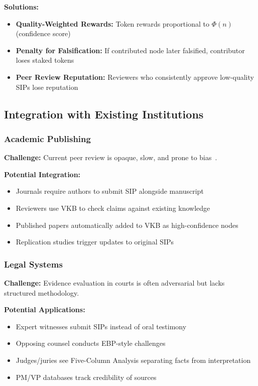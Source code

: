 \documentclass[11pt,a4paper]{article}
\theoremstyle{definition}
\theoremstyle{remark}
\newcommand{\VKB}{\textsc{VKB}}
\newcommand{\SIP}{\textsc{SIP}}
\newcommand{\EBP}{\textsc{EBP}}
\begin{document}
\textbf{Solutions:}
\begin{itemize}
    \item \textbf{Quality-Weighted Rewards:} Token rewards proportional to $\Phi(n)$ (confidence score)
    \item \textbf{Penalty for Falsification:} If contributed node later falsified, contributor loses staked tokens
    \item \textbf{Peer Review Reputation:} Reviewers who consistently approve low-quality \SIP{}s lose reputation
\end{itemize}

\subsection{Integration with Existing Institutions}

\subsubsection{Academic Publishing}

\textbf{Challenge:} Current peer review is opaque, slow, and prone to bias~\citep{ioannidis2005most}.

\textbf{Potential Integration:}
\begin{itemize}
    \item Journals require authors to submit \SIP{} alongside manuscript
    \item Reviewers use \VKB{} to check claims against existing knowledge
    \item Published papers automatically added to \VKB{} as high-confidence nodes
    \item Replication studies trigger updates to original \SIP{}s
\end{itemize}

\subsubsection{Legal Systems}

\textbf{Challenge:} Evidence evaluation in courts is often adversarial but lacks structured methodology.

\textbf{Potential Applications:}
\begin{itemize}
    \item Expert witnesses submit \SIP{}s instead of oral testimony
    \item Opposing counsel conducts \EBP{}-style challenges
    \item Judges/juries see Five-Column Analysis separating facts from interpretation
    \item PM/VP databases track credibility of sources
\end{itemize}
\end{document}
